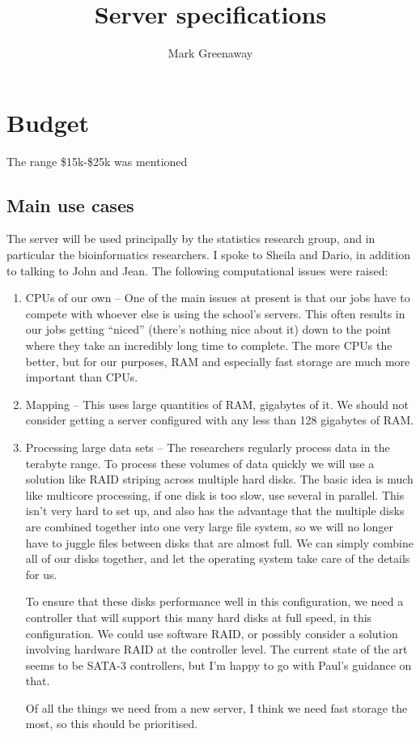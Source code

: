 \documentclass{amsart}
\author{Mark Greenaway}
\title{Server specifications}
\begin{document}
\section{Budget}
The range \$15k-\$25k was mentioned

\subsection{Main use cases}
The server will be used principally by the statistics research group, and in particular the bioinformatics researchers. I spoke to Sheila and Dario, in addition to talking to
John and Jean. The following computational issues were raised:

\begin{enumerate}
\item{CPUs of our own} -- One of the main issues at present is that our jobs have to
compete with whoever else is using the school's servers. This often results in our
jobs getting ``niced'' (there's nothing nice about it) down to the point where they
take an incredibly long time to complete. The more CPUs the better, but for our
purposes, RAM and especially fast storage are much more important than CPUs.

\item{Mapping} -- This uses large quantities of RAM, gigabytes of it. We should not
consider getting a server configured with any less than 128 gigabytes of RAM.

\item{Processing large data sets} -- The researchers regularly process data in the
terabyte range. To process these volumes of data quickly we will use a solution like
RAID striping across multiple hard disks. The basic idea is much like multicore processing,
if one disk is too slow, use several in parallel. This isn't very hard to set up, and
also has the advantage that the multiple disks are combined together into one very large
file system, so we will no longer have to juggle files between disks that are almost full.
We can simply combine all of our disks together, and let the operating system take care
of the details for us.

To ensure that these disks performance well in this configuration, we need a controller that 
will support this many hard disks at full speed, in this configuration. We could use 
software RAID, or possibly consider a solution involving hardware RAID at the controller 
level. The current state of the art seems to be SATA-3 controllers, but I'm happy to go with 
Paul's guidance on that.

Of all the things we need from a new server, I think we need fast storage the most, so this
should be prioritised.
\end{enumerate}
\end{document}
